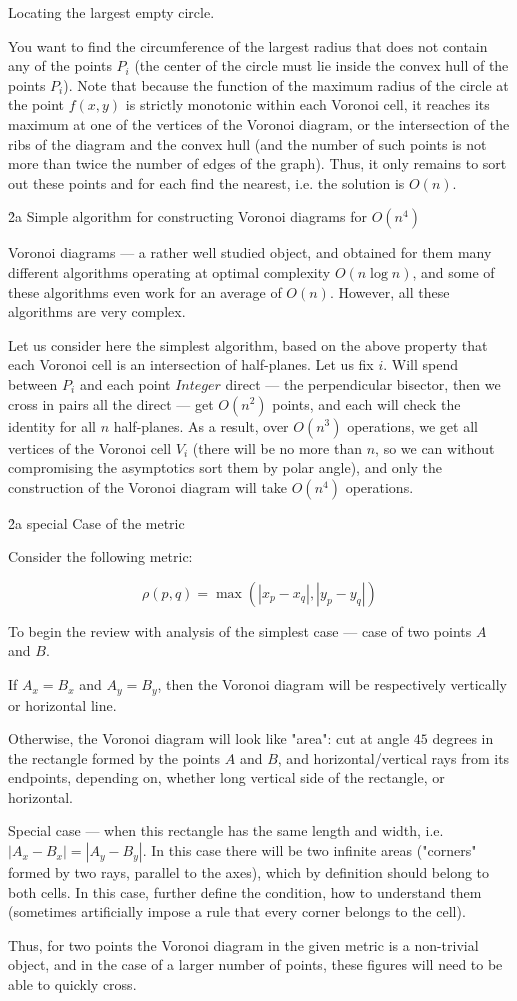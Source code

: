 {\li Locating the largest empty circle.

You want to find the circumference of the largest radius that does not contain any of the points $P_i$ (the center of the circle must lie inside the convex hull of the points $P_i$). Note that because the function of the maximum radius of the circle at the point $f(x,y)$ is strictly monotonic within each Voronoi cell, it reaches its maximum at one of the vertices of the Voronoi diagram, or the intersection of the ribs of the diagram and the convex hull (and the number of such points is not more than twice the number of edges of the graph). Thus, it only remains to sort out these points and for each find the nearest, i.e. the solution is $O(n)$.

}

\h2{a Simple algorithm for constructing Voronoi diagrams for $O(n^4)$}

Voronoi diagrams --- a rather well studied object, and obtained for them many different algorithms operating at optimal complexity $O (n \log n)$, and some of these algorithms even work for an average of $O (n)$. However, all these algorithms are very complex.

Let us consider here the simplest algorithm, based on the above property that each Voronoi cell is an intersection of half-planes. Let us fix $i$. Will spend between $P_i$ and each point $Integer$ direct --- the perpendicular bisector, then we cross in pairs all the direct --- get $O(n^2)$ points, and each will check the identity for all $n$ half-planes. As a result, over $O(n^3)$ operations, we get all vertices of the Voronoi cell $V_i$ (there will be no more than $n$, so we can without compromising the asymptotics sort them by polar angle), and only the construction of the Voronoi diagram will take $O(n^4)$ operations.

\h2{a special Case of the metric}

Consider the following metric:

$$ \rho(p,q) = \max (|x_p-x_q|, |y_p-y_q|) $$

To begin the review with analysis of the simplest case --- case of two points $A$ and $B$.

If $A_x=B_x$ and $A_y=B_y$, then the Voronoi diagram will be respectively vertically or horizontal line.

Otherwise, the Voronoi diagram will look like "area": cut at angle $45$ degrees in the rectangle formed by the points $A$ and $B$, and horizontal/vertical rays from its endpoints, depending on, whether long vertical side of the rectangle, or horizontal.

Special case --- when this rectangle has the same length and width, i.e. $|A_x-B_x| = |A_y-B_y|$. In this case there will be two infinite areas ("corners" formed by two rays, parallel to the axes), which by definition should belong to both cells. In this case, further define the condition, how to understand them (sometimes artificially impose a rule that every corner belongs to the cell).

Thus, for two points the Voronoi diagram in the given metric is a non-trivial object, and in the case of a larger number of points, these figures will need to be able to quickly cross.
